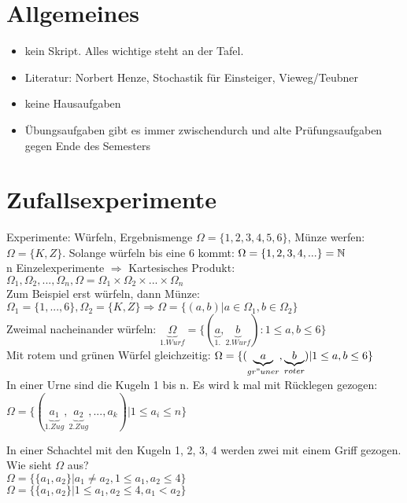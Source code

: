 \renewcommand{\ldate}{2015-10-05}

\section{Allgemeines}

\begin{itemize}
\item kein Skript. Alles wichtige steht an der Tafel.
\item Literatur: Norbert Henze, Stochastik für Einsteiger, Vieweg/Teubner
\item keine Hausaufgaben
\item Übungsaufgaben gibt es immer zwischendurch und alte Prüfungsaufgaben gegen Ende des Semesters
\end{itemize}

\section{Zufallsexperimente}

Experimente: Würfeln, Ergebnismenge $ \Omega = \{1,2,3,4,5,6\}$, Münze werfen: $ \Omega = \{K, Z\}$. Solange würfeln bis eine 6 kommt: $ \Omega = \{ 1,2,3,4,...\} = \mathbb{N} $\\
n Einzelexperimente $ \Rightarrow $ Kartesisches Produkt: $ \Omega_1, \Omega_2, ...,  \Omega_n, \Omega = \Omega_1 \times \Omega_2 \times ... \times  \Omega_n $\\
Zum Beispiel erst würfeln, dann Münze: \\
$ \Omega_1 = \{1,...,6\}, \Omega_2=\{K,Z\} \Rightarrow \Omega=\{(a,b) | a\in \Omega_1, b\in \Omega_2\}$\\
Zweimal nacheinander würfeln: $ \underbrace{\Omega}_{1. Wurf}=\{(\underbrace{a}_{1.},\underbrace{b}_{2. Wurf}) : 1 \leq a,b \leq 6 \} $\\

Mit rotem und grünen Würfel gleichzeitig: $ \Omega = \{(\underbrace{a}_{gr"uner}, \underbrace{b}_{roter}) | 1\leq a,b\leq 6\} $\\
In einer Urne sind die Kugeln 1 bis n. Es wird k mal mit Rücklegen gezogen: $ \Omega = \{(\underbrace{a_1}_{1. Zug}, \underbrace{a_2}_{2. Zug}, ..., a_k) | 1\leq a_i \leq n \}$

In einer Schachtel mit den Kugeln 1, 2, 3, 4 werden zwei mit einem Griff gezogen. Wie sieht $ \Omega $ aus?\\
$ \Omega=\{\{a_1,a_2\} | a_1 \neq a_2, 1\leq a_1,a_2\leq 4\} $\\
$ \Omega=\{\{a_1,a_2\} | 1\leq a_1, a_2\leq 4, a_1 < a_2 \} $\\

